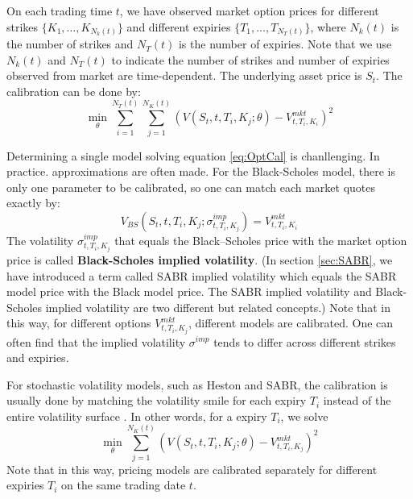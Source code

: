 \documentclass[letterpaper,12pt,titlepage,oneside,final]{book}
\numberwithin{equation}{section}
\theoremstyle{definition}
\newcommand{\Vmkt}{V^{mkt}}
\begin{document}
On each trading time $t$, we have observed market option prices for different strikes $\{K_1,\dots, K_{N_k(t)}\}$ and different expiries $\{T_1,\dots, T_{N_T(t)}\}$, where $N_k(t)$ is the number of strikes and $N_T(t)$ is the number of expiries.
Note that we use  $N_k(t)$ and $N_T(t)$ to indicate the number of strikes and number of expiries observed from market are time-dependent.
The underlying asset price is $S_t$. The calibration can be done by:
\begin{equation}
\min_{\theta}   \sum_{i=1}^{N_T(t)}  \sum_{j=1}^{N_K(t)} \left(V(S_t,t,T_i,K_j;\theta)-\Vmkt_{t,T_i,K_i}\right)^2 
\label{eq:OptCal}
\end{equation}

Determining a single model solving equation \eqref{eq:OptCal} is chanllenging. In practice. approximations are often made.
For the Black-Scholes model, there is only one parameter to be calibrated,
so  one can match each market quotes exactly by:
\[
V_{BS}(S_t,t,T_i,K_j;\sigma^{imp}_{t,T_i,K_j})=\Vmkt_{t,T_i,K_i}
\]
The volatility $\sigma^{imp}_{t,T_i,K_j}$ that equals the Black–Scholes price with the market option price is called \textbf{Black-Scholes implied volatility}. (In section \ref{sec:SABR}, we have introduced a term called SABR implied volatility which equals the SABR model price with the Black model price. The SABR implied volatility and  Black-Scholes implied volatility are two different but related concepts.)
Note that in this way, for different options $\Vmkt_{t,T_i,K_j}$, different models are calibrated.  One can often find that the implied volatility $\sigma^{imp}$ tends to differ across different strikes and expiries.

For stochastic volatility models, such as Heston and SABR, the calibration is usually done by matching the volatility smile for each expiry $T_i$ instead of the entire volatility surface \cite{heston1993closed,hagan2002managing,hulloptimal}. In other words, for a  expiry $T_i$, we solve
\[
\min_{\theta} \sum_{j=1}^{N_K(t)} \left(V(S_t,t,T_i,K_j;\theta)-\Vmkt_{t,T_i,K_j}\right)^2
\]
Note that in this way, pricing models are calibrated separately for different expiries $T_i$  on the same trading date $t$.
\end{document}
